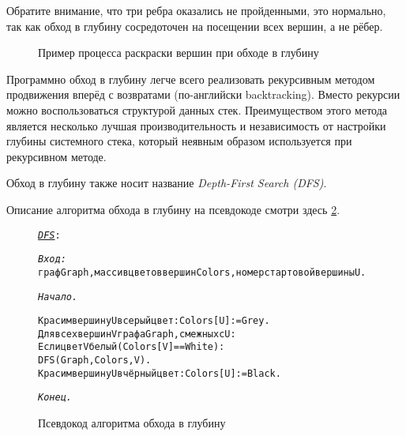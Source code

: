 Обратите внимание, что три ребра оказались не пройденными, это нормально, так 
как обход в глубину сосредоточен на посещении всех вершин, а не рёбер.

\begin{figure}[h]
	\center
	\caption{Пример процесса раскраски вершин при обходе в глубину}
	\label{picture: process coloring of the vertices in the DFS}
\end{figure}

Программно обход в глубину легче всего реализовать рекурсивным методом 
продвижения вперёд с возвратами (по-английски backtracking). Вместо рекурсии 
можно 
воспользоваться структурой данных стек. Преимуществом этого метода является 
несколько лучшая производительность и независимость от настройки глубины 
системного стека, который неявным образом используется при рекурсивном методе.

Обход в глубину также носит название \emph{Depth-First Search (DFS)}.

Описание алгоритма обхода в глубину на псевдокоде смотри здесь \ref{dfs}.

\begin{figure}[h]
\begin{alltt}
\textit{\underline{DFS}}:

\textit{Вход:}
  граф Graph, массив цветов вершин Colors, номер стартовой вершины U.

\textit{Начало.}

  Красим вершину U в серый цвет: Colors[U] := Grey.
  Для всех вершин V графа Graph, смежных с U:
    Если цвет V белый (Colors[V] == White):
      DFS(Graph, Colors, V).
  Красим вершину U в чёрный цвет: Colors[U] := Black.

\textit{Конец.}
\end{alltt}
\caption{Псевдокод алгоритма обхода в глубину}
\label{dfs}
\end{figure}

